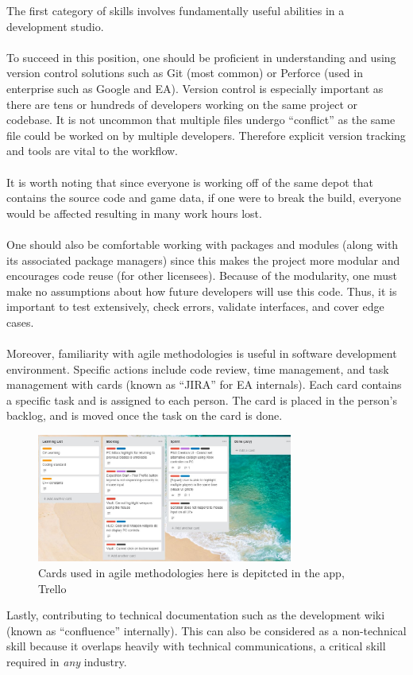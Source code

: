 \documentclass[10pt,letterpaper]{article}
\begin{document}
The first category of skills involves fundamentally useful abilities in a development studio.\\
\\
To succeed in this position, one should be proficient in understanding and using version control solutions such as Git (most common) or Perforce (used in enterprise such as Google and EA). Version control is especially important as there are tens or hundreds of developers working on the same project or codebase. It is not uncommon that multiple files undergo ``conflict'' as the same file could be worked on by multiple developers. Therefore explicit version tracking and tools are vital to the workflow.\\
\\
It is worth noting that since everyone is working off of the same depot that contains the source code and game data, if one were to break the build, everyone would be affected resulting in many work hours lost.\\
\\
One should also be comfortable working with packages and modules (along with its associated package managers) since this makes the project more modular and encourages code reuse (for other licensees). Because of the modularity, one must make no assumptions about how future developers will use this code. Thus, it is important to test extensively, check errors, validate interfaces, and cover edge cases.\\
\\
Moreover, familiarity with agile methodologies is useful in software development environment. Specific actions include code review, time management, and task management with cards (known as ``JIRA'' for EA internals). Each card contains a specific task and is assigned to each person. The card is placed in the person's backlog, and is moved once the task on the card is done.\\
\begin{figure}[H]
	\centering
	\includegraphics[width=0.75\textwidth]{assets/cards}
	\caption{Cards used in agile methodologies here is depitcted in the app, Trello}
	\label{fig:trello-cards}
\end{figure}
Lastly, contributing to technical documentation such as the development wiki (known as ``confluence'' internally). This can also be considered as a non-technical skill because it overlaps heavily with technical communications, a critical skill required in \textit{any} industry.\\
\end{document}
